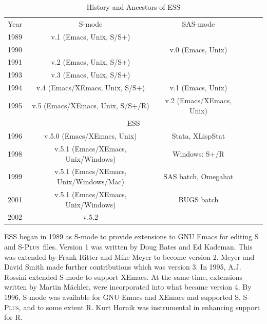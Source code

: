 \documentclass{article}
\newif\ifdraft
\newcommand*{\Splus}{\textsc{S-Plus}}
\newcommand{\stexttt}[1]{{\small\texttt{#1}}}
\newcommand{\emptyfig}{
\hspace*{42pt}\rule{324pt}{.25pt}\\
\hspace*{42pt}\rule{.25pt}{10pc}
\rule{316pt}{.25pt}
\rule{.25pt}{10pc}}
\begin{document}

\begin{table}[tbp]
  \centering
  \begin{tabular}{cccccc}
    Year & S-mode & SAS-mode \\ 
    1989 & v.1 (Emacs, Unix, S/S+) &  \\
    1990 &                         & v.0 (Emacs, Unix) \\
    1991 & v.2 (Emacs, Unix, S/S+) & \\
    1993 & v.3 (Emacs, Unix, S/S+) & \\
    1994 & v.4 (Emacs/XEmacs, Unix, S/S+)   & v.1 (Emacs, Unix) \\
    1995 & v.5 (Emacs/XEmacs, Unix, S/S+/R) & v.2 (Emacs/XEmacs, Unix) \\
    \hline & \multicolumn{2}{c}{ESS} \\ \hline 
    1996 & v.5.0 (Emacs/XEmacs, Unix)         &  Stata, XLispStat    \\
    1998 & v.5.1 (Emacs/XEmacs, Unix/Windows) &  Windows:  S+/R\\
    1999 & v.5.1 (Emacs/XEmacs, Unix/Windows/Mac) & SAS batch, Omegahat \\
    2001 & v.5.1 (Emacs/XEmacs, Unix/Windows)     & BUGS batch \\
    2002 & v.5.2 & \\
  \end{tabular}
  \caption{History and Ancestors of ESS}
  \label{tab:timeline}
\end{table}

ESS began in 1989 as S-mode to provide extensions to GNU Emacs for
editing S and \Splus\ files.  Version 1 was written by Doug Bates and
Ed Kademan.  This was extended by Frank Ritter and Mike Meyer to
become version 2.  Meyer and David Smith made further contributions
which was version 3.
In 1995, A.J. Rossini extended S-mode to support XEmacs.  At the same
time, extensions written by Martin M{\"a}chler, were incorporated into
what became version 4.  By 1996, S-mode was available for GNU Emacs
and XEmacs and supported S, \Splus, and to some extent R.  Kurt Hornik
was instrumental in enhancing support for R.
\end{document}
